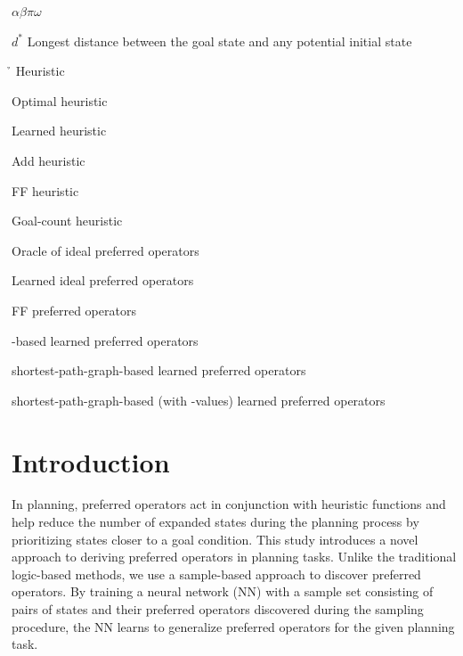 \documentclass[ppgc,diss,english]{iiufrgs}
\begin{document}
\begin{listofsymbols}{$\alpha\beta\pi\omega$}
       \item[$d^{*}$] Longest distance between the goal state and any potential initial state
       \item[\h] Heuristic
       \item[\hstar] Optimal heuristic
       \item[\hnn] Learned heuristic
       \item[\hadd] Add heuristic
       \item[\hff] FF heuristic
       \item[\hgc] Goal-count heuristic
       \item[\postartable] Oracle of ideal preferred operators
       \item[\postar] Learned ideal preferred operators
       \item[\poff] FF preferred operators
       \item[\pofsm] \bfsrw-based learned preferred operators
       \item[\pog] shortest-path-graph-based learned preferred operators
       \item[\pogstar] shortest-path-graph-based (with \hstar-values) learned preferred operators
\end{listofsymbols}

\listoffigures

\listoftables

\listofalgorithms

\tableofcontents

%
%
\chapter{Introduction}
\label{cha:introduction}
In planning, preferred operators act in conjunction with heuristic functions and help reduce the number of expanded states during the planning process by prioritizing states closer to a goal condition.
This study introduces a novel approach to deriving preferred operators in planning tasks. Unlike the traditional logic-based methods, we use a sample-based approach to discover preferred operators. By training a neural network (NN) with a sample set consisting of pairs of states and their preferred operators discovered during the sampling procedure, the NN learns to generalize preferred operators for the given planning task.
\end{document}
